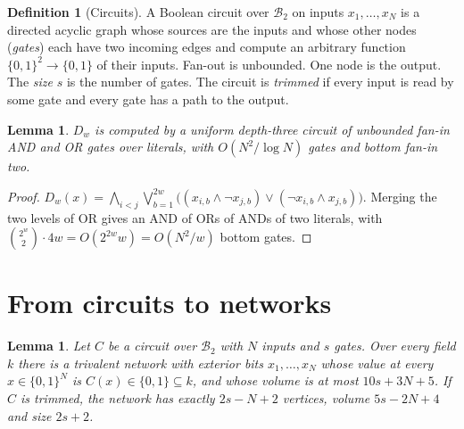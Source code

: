 \documentclass[11pt]{article}
\newtheorem{lemma}[theorem]{Lemma}
\theoremstyle{definition}
\newtheorem{definition}[theorem]{Definition}
\newcommand{\Dw}{D_w}
\newcommand{\B}{\mathcal{B}_2}
\begin{document}
\begin{definition}[Circuits]
A Boolean circuit over $\B$ on inputs $x_1,\dots,x_N$ is a directed acyclic graph whose sources are the inputs and whose other nodes (\emph{gates}) each have two incoming edges and compute an arbitrary function $\{0,1\}^2\to\{0,1\}$ of their inputs. Fan-out is unbounded. One node is the output. The \emph{size} $s$ is the number of gates. The circuit is \emph{trimmed} if every input is read by some gate and every gate has a path to the output.
\end{definition}

\begin{lemma}\label{lem:ac0}
$\Dw$ is computed by a uniform depth-three circuit of unbounded fan-in AND and OR gates over literals, with $O(N^2/\log N)$ gates and bottom fan-in two.
\end{lemma}

\begin{proof}
$\Dw(x) = \bigwedge_{i<j}\bigvee_{b=1}^{2w}\bigl((x_{i,b}\wedge\neg x_{j,b})\vee(\neg x_{i,b}\wedge x_{j,b})\bigr)$. Merging the two levels of OR gives an AND of ORs of ANDs of two literals, with $\binom{2^w}{2}\cdot 4w = O(2^{2w}w) = O(N^2/w)$ bottom gates.
\end{proof}

\section{From circuits to networks}\label{sec:translate}

\begin{lemma}\label{lem:translate}
Let $C$ be a circuit over $\B$ with $N$ inputs and $s$ gates. Over every field $k$ there is a trivalent network with exterior bits $x_1,\dots,x_N$ whose value at every $x\in\{0,1\}^N$ is $C(x)\in\{0,1\}\subseteq k$, and whose volume is at most $10s+3N+5$. If $C$ is trimmed, the network has exactly $2s-N+2$ vertices, volume $5s-2N+4$ and size $2s+2$.
\end{lemma}
\end{document}
